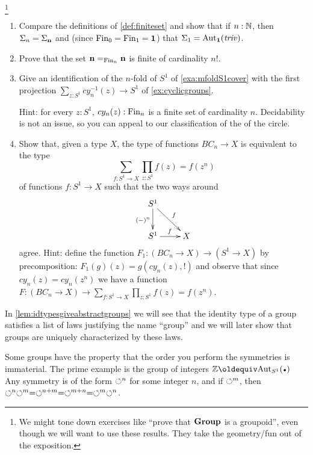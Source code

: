 \footnote{We might tone down exercises like ``prove that $\mathbf{Group}$ is a groupoid'', even though we will want to use these results.  They take the geometry/fun out of the exposition.}
\begin{xca}
  \label{xca:somedetailsonfinitegroupstocheck}
  \begin{enumerate}
  \item Compare the definitions of \cref{def:finiteset} and show that if $n:\mathbb{N}$, then $\Sigma_n=\Sigma_{\mathbf{n} }$ %
and (since $\operatorname{Fin}_0=\operatorname{Fin}_1=\mathbf{1}$) that $\Sigma_{1}=\mathrm{Aut}_{\mathbf{1} }(\mathop{\mathit{triv}})$.
\item Prove that the set $\mathbf{n} =_{\operatorname{Fin}_n}\mathbf{n} $ is finite of cardinality $n!$.
\item Give an identification of the $n$-fold \covering of $S^1$ of \cref{exa:mfoldS1cover} with the first projection $\sum_{z:S^1}cy_n^{-1}(z)\to S^1$ of \cref{ex:cyclicgroups}.

Hint: for every $z:S^1$, $cy_n(z):\operatorname{Fin}_n$ is a finite set of cardinality $n$.  
Decidability is not an issue, so you can appeal to our classification of the \coverings of the circle.
\item Show that, given a type $X$, the type of functions $BC_n\to X$ is equivalent to the type 
$$\sum_{f:S^1\to X}\prod_{z:S^1}f(z)=f(z^n)$$ of functions $f:S^1\to X$ such that the two ways around
$$\xymatrix{S^1\ar[d]_{(-)^n}\ar[dr]^f&\\S^1\ar[r]^f&X}$$
agree. Hint: define the function $F_1:(BC_n\to X)\to (S^1\to X)$ by precomposition:
$F_1(g)(z)=g(cy_n(z),!)$ and observe that since $cy_n(z)=cy_n(z^n)$ we have a 
function $F:(BC_n\to X)\to \sum_{f:S^1\to X}\prod_{z:S^1}f(z)=f(z^n)$.
\end{enumerate} 
\end{xca}

\begin{remark}
In \cref{lem:idtypesgiveabstractgroups} we will see that the identity type of a group satisfies a list of laws justifying the name ``group''
and we will later show that groups are uniquely characterized by these laws.
\end{remark}
Some groups have the property that the order you perform the symmetries is immaterial.  The prime example is the group of integers $\ZZ\oldequiv \aut_{S^1}(\base)$  Any symmetry is of the form $\circlearrowleft^n$ for some integer $n$, and if $\circlearrowleft^m$, then $\circlearrowleft^n\circlearrowleft^m=\circlearrowleft^{n+m}=\circlearrowleft^{m+n}=\circlearrowleft^m\circlearrowleft^n$.

